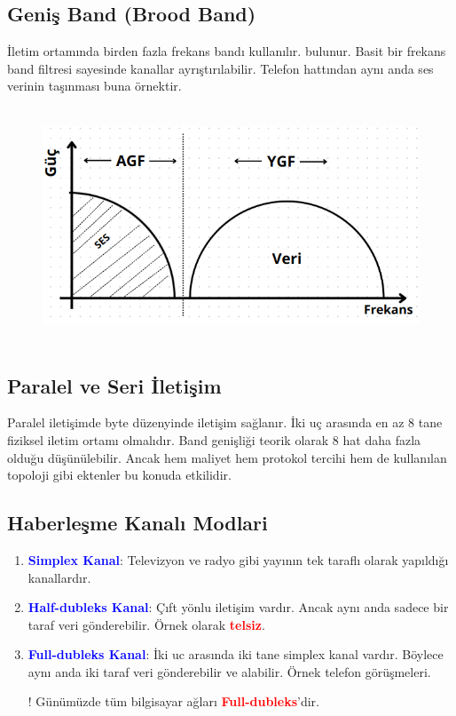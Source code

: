 \subsection{Geniş Band (Brood Band)}
\tab İletim ortamında birden fazla frekans bandı kullanılır.
bulunur. Basit bir frekans band filtresi sayesinde kanallar ayrıştırılabilir.
Telefon hattından aynı anda ses verinin taşınması buna örnektir.
\begin{figure}[ht]
    \centering
    \includegraphics[width=17cm,height=7cm]{images/brood_band}
\end{figure}

\subsection{Paralel ve Seri İletişim}
\tab Paralel iletişimde byte düzenyinde iletişim sağlanır.
İki uç arasında en az 8 tane fiziksel iletim ortamı olmalıdır.
Band genişliği teorik olarak 8 hat daha fazla olduğu düşünülebilir.
Ancak hem maliyet hem protokol tercihi hem de kullanılan topoloji gibi ektenler bu konuda etkilidir.
\newpage

\subsection{Haberleşme Kanalı Modlari}
\begin{enumerate}[label=\alph*)]
    \item \textbf{\textcolor{blue}{ Simplex Kanal}}: Televizyon ve radyo gibi yayının tek taraflı olarak yapıldığı kanallardır.
    \item  \textbf{\textcolor{blue}{ Half-dubleks Kanal}}: Çıft yönlu iletişim vardır.
    Ancak aynı anda sadece bir taraf veri gönderebilir. Örnek olarak \textbf{\textcolor{red}{telsiz}}.
    \item \textbf{\textcolor{blue}{ Full-dubleks Kanal}}: İki uc arasında iki tane simplex kanal vardır.
    Böylece aynı anda iki taraf veri gönderebilir ve alabilir.
    Örnek telefon görüşmeleri.
    \item [!] Günümüzde tüm bilgisayar ağları \textbf{\textcolor{red}{Full-dubleks}}'dir.
\end{enumerate}


